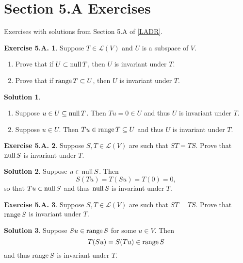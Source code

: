 \documentclass[12pt]{article}
\theoremstyle{definition}
\theoremstyle{exercise}
\newtheorem{exercise}{Exercise 5.A.}
\theoremstyle{solution}
\newtheorem*{solution}{Solution}
\newcommand{\lmap}{\mathcal{L}}
\newcommand{\Null}{\text{null\,}}
\newcommand{\Range}{\text{range\,}}
\begin{document}
\section{Section 5.A Exercises}

Exercises with solutions from Section 5.A of \hyperlink{ladr}{[LADR]}.

\begin{exercise}
\label{ex:1}
    Suppose \( T \in \lmap(V) \) and \( U \) is a subspace of \( V \).
    \begin{enumerate}
        \item Prove that if \( U \subset \Null T \), then \( U \) is invariant under \( T \).

        \item Prove that if \( \Range T \subset U \), then \( U \) is invariant under \( T \).
    \end{enumerate}
\end{exercise}

\begin{solution}
    \begin{enumerate}
        \item Suppose \( u \in U \subseteq \Null T \). Then \( Tu = 0 \in U \) and thus \( U \) is invariant under \( T \).

        \item Suppose \( u \in U \). Then \( Tu \in \Range T \subseteq U \) and thus \( U \) is invariant under \( T \).
    \end{enumerate}
\end{solution}

\begin{exercise}
\label{ex:2}
    Suppose \( S, T \in \lmap(V) \) are such that \( ST = TS \). Prove that \( \Null S \) is invariant under \( T \).
\end{exercise}

\begin{solution}
    Suppose \( u \in \Null S \). Then
    \[
        S(Tu) = T(Su) = T(0) = 0,
    \]
    so that \( Tu \in \Null S \) and thus \( \Null S \) is invariant under \( T \).
\end{solution}

\begin{exercise}
\label{ex:3}
    Suppose \( S, T \in \lmap(V) \) are such that \( ST = TS \). Prove that \( \Range S \) is invariant under \( T \).
\end{exercise}

\begin{solution}
    Suppose \( Su \in \Range S \) for some \( u \in V \). Then
    \[
        T(Su) = S(Tu) \in \Range S
    \]
    and thus \( \Range S \) is invariant under \( T \).
\end{solution}
\end{document}
